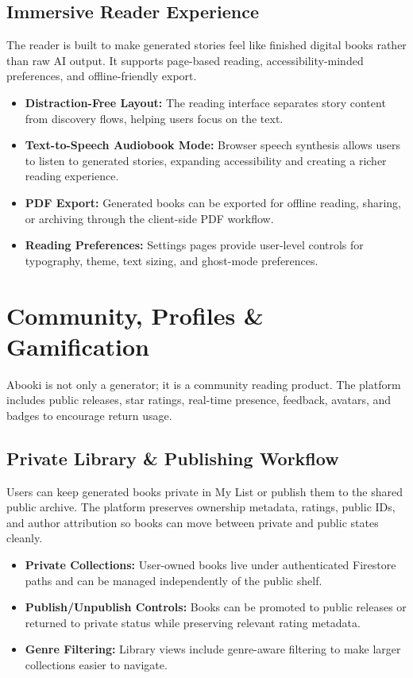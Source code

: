 \documentclass[11pt, a4paper]{article}
\begin{document}
\subsection{Immersive Reader Experience}
The reader is built to make generated stories feel like finished digital books rather than raw AI output. It supports page-based reading, accessibility-minded preferences, and offline-friendly export.

\begin{itemize}[label=\textcolor{abookigold}{\textbullet}]
    \item \textbf{Distraction-Free Layout:} The reading interface separates story content from discovery flows, helping users focus on the text.
    \item \textbf{Text-to-Speech Audiobook Mode:} Browser speech synthesis allows users to listen to generated stories, expanding accessibility and creating a richer reading experience.
    \item \textbf{PDF Export:} Generated books can be exported for offline reading, sharing, or archiving through the client-side PDF workflow.
    \item \textbf{Reading Preferences:} Settings pages provide user-level controls for typography, theme, text sizing, and ghost-mode preferences.
\end{itemize}

\section{Community, Profiles \& Gamification}
Abooki is not only a generator; it is a community reading product. The platform includes public releases, star ratings, real-time presence, feedback, avatars, and badges to encourage return usage.

\subsection{Private Library \& Publishing Workflow}
Users can keep generated books private in My List or publish them to the shared public archive. The platform preserves ownership metadata, ratings, public IDs, and author attribution so books can move between private and public states cleanly.

\begin{itemize}[label=\textcolor{abookigold}{\textbullet}]
    \item \textbf{Private Collections:} User-owned books live under authenticated Firestore paths and can be managed independently of the public shelf.
    \item \textbf{Publish/Unpublish Controls:} Books can be promoted to public releases or returned to private status while preserving relevant rating metadata.
    \item \textbf{Genre Filtering:} Library views include genre-aware filtering to make larger collections easier to navigate.
\end{itemize}
\end{document}
